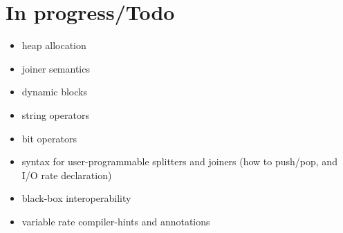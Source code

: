 \documentclass{tr}
\begin{document}

\section{In progress/Todo}
\begin{itemize}
\item heap allocation
\item joiner semantics
\item dynamic blocks
\item string operators
\item bit operators
\item syntax for user-programmable splitters and joiners (how to
push/pop, and I/O rate declaration)
\item black-box interoperability
\item variable rate compiler-hints and annotations
\end{itemize}
\end{document}
